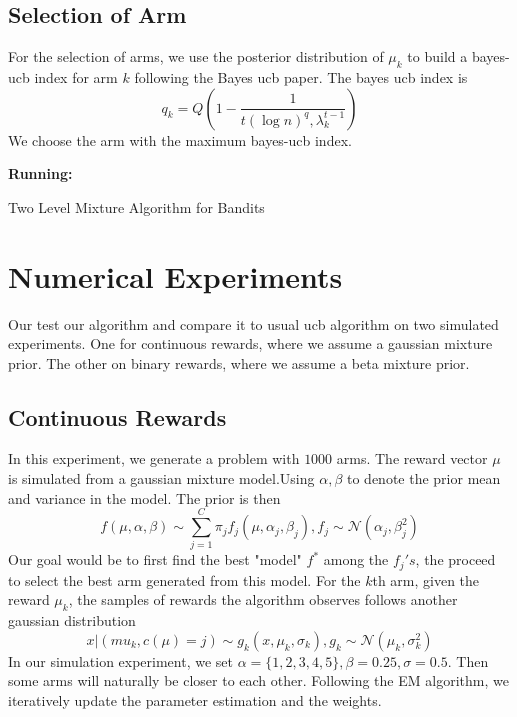 \documentclass{article}
\begin{document}
\subsection{Selection of Arm}
For the selection of arms, we use the posterior distribution of $\mu_k$ to build a bayes-ucb index for arm $k$ following the Bayes ucb paper\citep{bayesucb}. The bayes ucb index is 
\begin{equation}
q_k = Q(1-\frac{1}{t(\log n)^q,\lambda_k^{t-1}})
\end{equation}
We choose the arm with the maximum bayes-ucb index. \\

\begin{algorithm}[h]
\SetAlgoLined
\begin{algorithmic}
\STATE \textbf{Running:}
\end{algorithmic}
\caption{ Two Level Mixture Algorithm for Bandits }
\end{algorithm}


\section{Numerical Experiments}
Our test our algorithm and compare it to usual ucb algorithm on two simulated experiments. One for continuous rewards, where we assume a gaussian mixture prior. The other on binary rewards, where we assume a beta mixture prior.
\subsection{Continuous Rewards}
In this experiment, we generate a problem with $1000$ arms. The reward vector $\mu$ is simulated from a gaussian mixture model.Using $\alpha,\beta$ to denote the prior mean and variance in the model. The prior is then
\begin{equation}
f(\mu,\alpha,\beta) \sim \sum\limits_{j=1}^C \pi_j f_j(\mu,\alpha_j,\beta_j), f_j \sim \mathcal{N}(\alpha_j,\beta_j^2)
\end{equation} 
Our goal would be to first find the best "model" $f^*$ among the $f_j's$, the proceed to select the best arm generated from this model. For the $k$th arm, given the reward $\mu_k$, the samples of rewards the algorithm observes follows another gaussian distribution
\begin{equation}
x|(mu_k,c(\mu)=j) \sim g_k(x,\mu_k,\sigma_k), g_k \sim \mathcal{N}(\mu_k,\sigma_k^2)
\end{equation}
In our simulation experiment, we set $\alpha = \{1,2,3,4,5\},\beta = 0.25,\sigma=0.5$. Then some arms will naturally be closer to each other. Following the EM algorithm, we iteratively update the parameter estimation and the weights.
\end{document}

